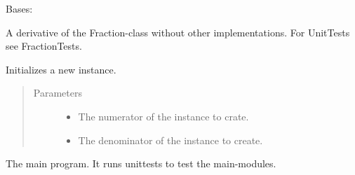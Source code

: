 \documentclass[letterpaper,10pt,english]{sphinxmanual}
\begin{document}
\begin{fulllineitems}
\label{\detokenize{bruch:bruch.Bruch}}
Bases: {\hyperref[\detokenize{fraction:fraction.Fraction}]{}}

A derivative of the Fraction-class without other implementations.
For UnitTests see FractionTests.

\begin{fulllineitems}
\label{\detokenize{bruch:bruch.Bruch.__init__}}
Initializes a  new instance.
\begin{quote}\begin{description}
\item[{Parameters}] \leavevmode\begin{itemize}
\item {} 
 \textendash{} The numerator of the instance to crate.

\item {} 
 \textendash{} The denominator of the instance to create.

\end{itemize}

\end{description}\end{quote}

\end{fulllineitems}


\end{fulllineitems}


\begin{fulllineitems}
\label{\detokenize{bruch:bruch.main}}
The main program. It runs unittests to test the main-modules.

\end{fulllineitems}

\end{document}
